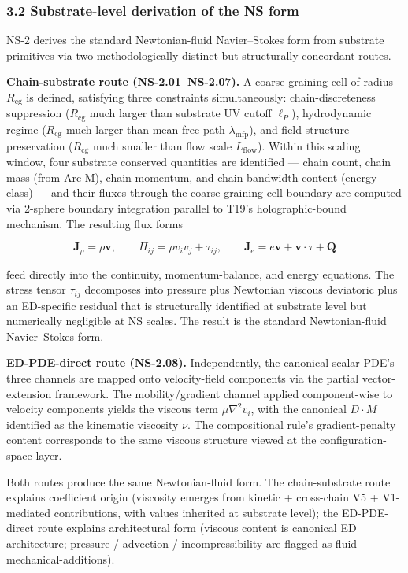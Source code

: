 \documentclass[
  11pt,a4paper]{article}
\begin{document}
\subsubsection{3.2 Substrate-level derivation of the NS
form}\label{substrate-level-derivation-of-the-ns-form}

NS-2 derives the standard Newtonian-fluid Navier--Stokes form from
substrate primitives via two methodologically distinct but structurally
concordant routes.

\textbf{Chain-substrate route (NS-2.01--NS-2.07).} A coarse-graining
cell of radius \(R_\mathrm{cg}\) is defined, satisfying three
constraints simultaneously: chain-discreteness suppression
(\(R_\mathrm{cg}\) much larger than substrate UV cutoff \(\ell_P\)),
hydrodynamic regime (\(R_\mathrm{cg}\) much larger than mean free path
\(\lambda_\mathrm{mfp}\)), and field-structure preservation
(\(R_\mathrm{cg}\) much smaller than flow scale \(L_\mathrm{flow}\)).
Within this scaling window, four substrate conserved quantities are
identified --- chain count, chain mass (from Arc M), chain momentum, and
chain bandwidth content (energy-class) --- and their fluxes through the
coarse-graining cell boundary are computed via 2-sphere boundary
integration parallel to T19's holographic-bound mechanism. The resulting
flux forms

\[\mathbf{J}_\rho = \rho \mathbf{v}, \qquad \Pi_{ij} = \rho v_i v_j + \tau_{ij}, \qquad \mathbf{J}_e = e \mathbf{v} + \mathbf{v} \cdot \tau + \mathbf{Q}\]

feed directly into the continuity, momentum-balance, and energy
equations. The stress tensor \(\tau_{ij}\) decomposes into pressure plus
Newtonian viscous deviatoric plus an ED-specific residual that is
structurally identified at substrate level but numerically negligible at
NS scales. The result is the standard Newtonian-fluid Navier--Stokes
form.

\textbf{ED-PDE-direct route (NS-2.08).} Independently, the canonical
scalar PDE's three channels are mapped onto velocity-field components
via the partial vector-extension framework. The mobility/gradient
channel applied component-wise to velocity components yields the viscous
term \(\mu \nabla^2 v_i\), with the canonical \(D \cdot M\) identified
as the kinematic viscosity \(\nu\). The compositional rule's
gradient-penalty content corresponds to the same viscous structure
viewed at the configuration-space layer.

Both routes produce the same Newtonian-fluid form. The chain-substrate
route explains coefficient origin (viscosity emerges from kinetic +
cross-chain V5 + V1-mediated contributions, with values inherited at
substrate level); the ED-PDE-direct route explains architectural form
(viscous content is canonical ED architecture; pressure / advection /
incompressibility are flagged as fluid-mechanical-additions).
\end{document}
